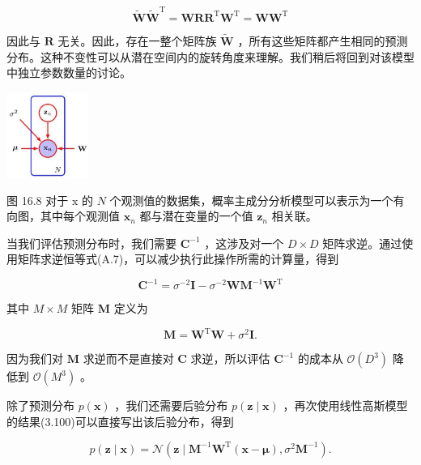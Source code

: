 \documentclass[10pt]{report}
\begin{document}
\[
\widetilde{\mathbf{W}}{\widetilde{\mathbf{W}}}^{\mathrm{T}} = {\mathbf{{WRR}}}^{\mathrm{T}}{\mathbf{W}}^{\mathrm{T}} = {\mathbf{{WW}}}^{\mathrm{T}} \tag{16.40}
\]

因此与 \(\mathbf{R}\) 无关。因此，存在一整个矩阵族 \(\widetilde{\mathbf{W}}\) ，所有这些矩阵都产生相同的预测分布。这种不变性可以从潜在空间内的旋转角度来理解。我们稍后将回到对该模型中独立参数数量的讨论。

\begin{center}
\includegraphics[max width=0.2\textwidth]{images/0194e279-9b28-703a-88f4-c3ac21e2010d_528_1242_345_297_310_0.jpg}
\end{center}
\hspace*{3em} 

图 16.8 对于 \(\mathrm{x}\) 的 \(N\) 个观测值的数据集，概率主成分分析模型可以表示为一个有向图，其中每个观测值 \({\mathbf{x}}_{n}\) 都与潜在变量的一个值 \({\mathbf{z}}_{n}\) 相关联。

当我们评估预测分布时，我们需要 \({\mathbf{C}}^{-1}\) ，这涉及对一个 \(D \times  D\) 矩阵求逆。通过使用矩阵求逆恒等式(A.7)，可以减少执行此操作所需的计算量，得到

\[
{\mathbf{C}}^{-1} = {\sigma }^{-2}\mathbf{I} - {\sigma }^{-2}\mathbf{W}{\mathbf{M}}^{-1}{\mathbf{W}}^{\mathrm{T}} \tag{16.41}
\]

其中 \(M \times  M\) 矩阵 \(\mathbf{M}\) 定义为

\[
\mathbf{M} = {\mathbf{W}}^{\mathrm{T}}\mathbf{W} + {\sigma }^{2}\mathbf{I}. \tag{16.42}
\]

因为我们对 \(\mathbf{M}\) 求逆而不是直接对 \(\mathbf{C}\) 求逆，所以评估 \({\mathbf{C}}^{-1}\) 的成本从 \(\mathcal{O}\left( {D}^{3}\right)\) 降低到 \(\mathcal{O}\left( {M}^{3}\right)\) 。

除了预测分布 \(p\left( \mathbf{x}\right)\) ，我们还需要后验分布 \(p\left( {\mathbf{z} \mid  \mathbf{x}}\right)\) ，再次使用线性高斯模型的结果(3.100)可以直接写出该后验分布，得到

\[
p\left( {\mathbf{z} \mid  \mathbf{x}}\right)  = \mathcal{N}\left( {\mathbf{z} \mid  {\mathbf{M}}^{-1}{\mathbf{W}}^{\mathrm{T}}\left( {\mathbf{x} - \mathbf{\mu }}\right) ,{\sigma }^{2}{\mathbf{M}}^{-1}}\right) . \tag{16.43}
\]
\end{document}

